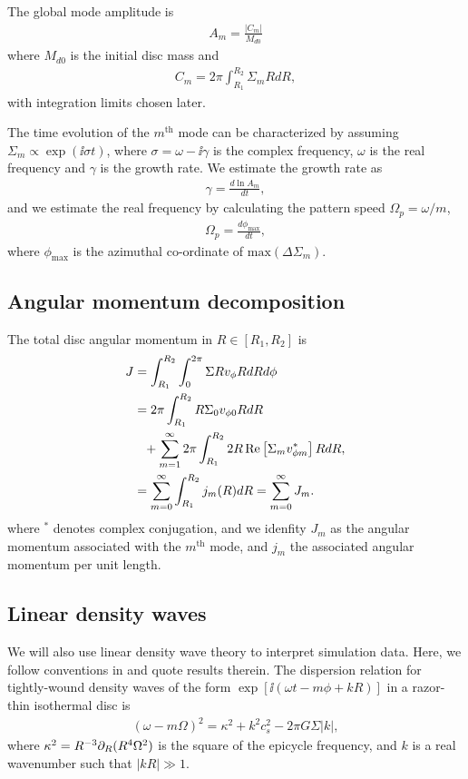 The global mode amplitude is 
\begin{align}
  A_m = \frac{|C_m|}{M_{d0}}
\end{align}
where $M_{d0}$ is the initial disc mass and 
\begin{align}
  C_m = 2\pi\int_{R_1}^{R_2} \Sigma_m RdR, 
\end{align}
with integration limits chosen later. 

The time evolution of the $m^\mathrm{th}$ mode can be characterized by
assuming 
$\Sigma_m\propto\exp{(\ii \sigma t)}$, where
$\sigma = \omega - \ii\gamma$ is the complex frequency, $\omega$ is
the real frequency and $\gamma$ is the growth rate.
We estimate the growth rate as
\begin{align}
  \gamma = \frac{d\ln{A_m}}{dt},
\end{align}
and we estimate the real frequency by calculating the pattern speed
$\Omega_p = \omega/m$,
\begin{align}
  \Omega_p = \frac{d\phi_\mathrm{max}}{dt},
\end{align}
where $\phi_\mathrm{max}$ is the azimuthal co-ordinate of
$\mathrm{max}(\Delta\Sigma_m)$. 


\subsection{Angular momentum decomposition}
The total disc angular momentum in $R\in[R_1,R_2]$ is
\begin{align}
  J &= \int_{R_1}^{R_2}\int_0^{2\pi} \Sigma Rv_\phi RdRd\phi \notag\\
  &= 2\pi\int_{R_1}^{R_2}R\Sigma_0 v_{\phi0} R dR \notag\\ 
  &\phantom{=}+
  \sum_{m=1}^\infty2\pi\int_{R_1}^{R_2} 2R\operatorname{Re}\left[\Sigma_m v_{\phi
      m}^*\right] RdR, \notag\\
  &= \sum_{m=0}^\infty \int_{R_1}^{R_2}  j_m(R) dR = \sum_{m=0}^\infty J_m. 
\end{align}
where $^*$ denotes complex conjugation, and we idenfity $J_m$ as the angular momentum 
associated with the $m^\mathrm{th}$ mode, and $j_m$ the associated
angular momentum per unit length. 

\subsection{Linear density waves}\label{wkb}
We will also use linear density wave theory to interpret
simulation data. Here, we follow conventions in \cite{shu91} and quote
results therein. The dispersion relation for tightly-wound density
waves of the form 
$\exp{[\ii(\omega t - m \phi + kR)]}$ in a razor-thin
isothermal disc is 
\begin{align}\label{dispersion}
  (\omega - m\Omega)^2 = \kappa^2 + k^2c_s^2 - 2\pi G \Sigma |k|, 
\end{align}
where $\kappa^2 = R^{-3}\partial_R(R^4\Omega^2)$ is the square of the epicycle frequency, 
and $k$ is a real wavenumber such that $|kR|\gg1$. 


